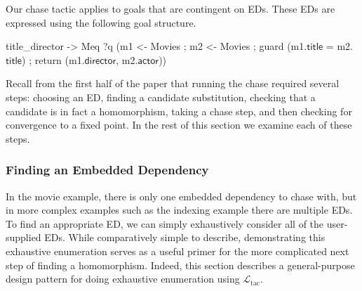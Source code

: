 \documentclass[preprint]{sigplanconf}
\newcommand{\ltac}[0]{\ensuremath{\mathcal{L}_{\mathrm{tac}}}}
\begin{document}
Our chase tactic applies to goals that are contingent on EDs.
These EDs are expressed using the following goal structure.
\begin{coq}
title_director ->
Meq ?q
    (m1 <- Movies ; m2 <- Movies ;
     guard (m1.$\textsf{title}$ = m2.$\textsf{title}$) ;
     return (m1.$\textsf{director}$, m2.$\textsf{actor}$))
\end{coq}

Recall from the first half of the paper that running the chase required several steps: choosing an ED, finding a candidate substitution, checking that a candidate is in fact a homomorphism, taking a chase step, and then checking for convergence to a fixed point.  In the rest of this section we examine each of these steps.



\subsubsection{Finding an Embedded Dependency}
\label{sec:traverse-ed}

In the movie example, there is only one embedded dependency to chase with, but in more complex examples such as the indexing example there are multiple EDs.
To find an appropriate ED, we can simply exhaustively consider all of the user-supplied EDs.
While comparatively simple to describe, demonstrating this exhaustive enumeration serves as a useful primer for the more complicated next step of finding a homomorphism.  Indeed, this section describes a general-purpose design pattern for doing exhaustive enumeration using \ltac{}.
\end{document}
